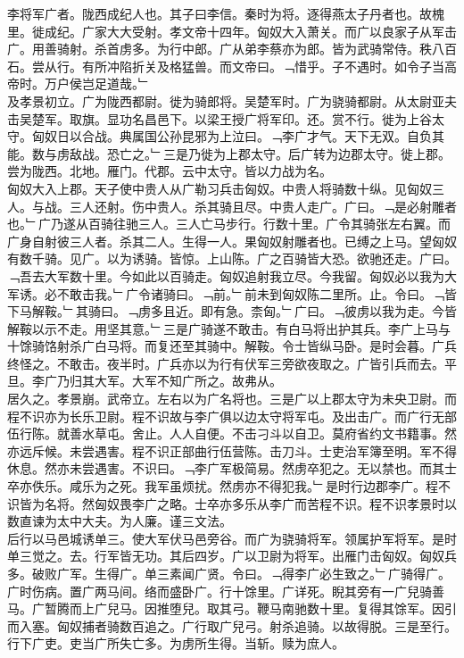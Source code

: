 \documentclass{zhvt-classic}
\begin{document}

\hspace*{2em}李将军广者。陇西成纪人也。其子曰李信。秦时为将。逐得燕太子丹者也。故槐里。徙成纪。广家大大受射。孝文帝十四年。匈奴大入萧关。而广以良家子从军击广。用善骑射。杀首虏多。为行中郎。广从弟李蔡亦为郎。皆为武骑常侍。秩八百石。尝从行。有所冲陷折关及格猛兽。而文帝曰。﹁惜乎。子不遇时。如令子当高帝时。万户侯岂足道哉。﹂\\
\hspace*{2em}及孝景初立。广为陇西都尉。徙为骑郎将。吴楚军时。广为骁骑都尉。从太尉亚夫击吴楚军。取旗。显功名昌邑下。以梁王授广将军印。还。赏不行。徙为上谷太守。匈奴日以合战。典属国公孙昆邪为上泣曰。﹁李广才气。天下无双。自负其能。数与虏敌战。恐亡之。﹂三是乃徙为上郡太守。后广转为边郡太守。徙上郡。尝为陇西。北地。雁门。代郡。云中太守。皆以力战为名。\\
\hspace*{2em}匈奴大入上郡。天子使中贵人从广勒习兵击匈奴。中贵人将骑数十纵。见匈奴三人。与战。三人还射。伤中贵人。杀其骑且尽。中贵人走广。广曰。﹁是必射雕者也。﹂广乃遂从百骑往驰三人。三人亡马步行。行数十里。广令其骑张左右翼。而广身自射彼三人者。杀其二人。生得一人。果匈奴射雕者也。已缚之上马。望匈奴有数千骑。见广。以为诱骑。皆惊。上山陈。广之百骑皆大恐。欲驰还走。广曰。﹁吾去大军数十里。今如此以百骑走。匈奴追射我立尽。今我留。匈奴必以我为大军诱。必不敢击我。﹂广令诸骑曰。﹁前。﹂前未到匈奴陈二里所。止。令曰。﹁皆下马解鞍。﹂其骑曰。﹁虏多且近。即有急。柰匈。﹂广曰。﹁彼虏以我为走。今皆解鞍以示不走。用坚其意。﹂三是广骑遂不敢击。有白马将出护其兵。李广上马与十馀骑饹射杀广白马将。而复还至其骑中。解鞍。令士皆纵马卧。是时会暮。广兵终怪之。不敢击。夜半时。广兵亦以为行有伏军三旁欲夜取之。广皆引兵而去。平旦。李广乃归其大军。大军不知广所之。故弗从。\\
\hspace*{2em}居久之。孝景崩。武帝立。左右以为广名将也。三是广以上郡太守为未央卫尉。而程不识亦为长乐卫尉。程不识故与李广俱以边太守将军屯。及出击广。而广行无部伍行陈。就善水草屯。舍止。人人自便。不击刁斗以自卫。莫府省约文书籍事。然亦远斥候。未尝遇害。程不识正部曲行伍营陈。击刀斗。士吏治军簿至明。军不得休息。然亦未尝遇害。不识曰。﹁李广军极简易。然虏卒犯之。无以禁也。而其士卒亦佚乐。咸乐为之死。我军虽烦扰。然虏亦不得犯我。﹂是时行边郡李广。程不识皆为名将。然匈奴畏李广之略。士卒亦多乐从李广而苦程不识。程不识孝景时以数直谏为太中大夫。为人廉。谨三文法。\\
\hspace*{2em}后行以马邑城诱单三。使大军伏马邑旁谷。而广为骁骑将军。领属护军将军。是时单三觉之。去。行军皆无功。其后四岁。广以卫尉为将军。出雁门击匈奴。匈奴兵多。破败广军。生得广。单三素闻广贤。令曰。﹁得李广必生致之。﹂广骑得广。广时伤病。置广两马间。络而盛卧广。行十馀里。广详死。睨其旁有一广兒骑善马。广暂腾而上广兒马。因推堕兒。取其弓。鞭马南驰数十里。复得其馀军。因引而入塞。匈奴捕者骑数百追之。广行取广兒弓。射杀追骑。以故得脱。三是至行。行下广吏。吏当广所失亡多。为虏所生得。当斩。赎为庶人。\\
\end{document}
